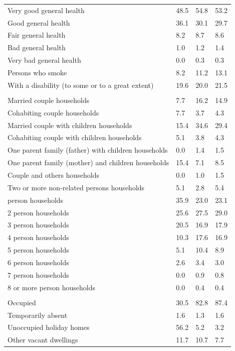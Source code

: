\documentclass{article}
\begin{document}
\begin{table}[h]
\begin{tabular}{KTTT}
    \hline
Very good general health & 48.5& 54.8& 53.2\\
Good general health & 36.1& 30.1& 29.7\\
Fair general health & 8.2& 8.7& 8.6\\
Bad general health & 1.0& 1.2& 1.4\\
Very bad general health & 0.0& 0.3& 0.3\\
    \hline
Persons who smoke &  8.2& 11.2& 13.1\\
    \hline
With a disability (to some or to a great extent) & 19.6& 20.0& 21.5\\
\hline
    \\ 
    \hline
Married couple households &  7.7& 16.2& 14.9\\
Cohabiting couple households & 7.7& 3.7& 4.3\\
Married couple with children households & 15.4& 34.6& 29.4\\
Cohabiting couple with children households & 5.1& 3.8& 4.3\\
One parent family (father) with  children households & 0.0& 1.4& 1.5\\
One parent family (mother) and children households & 15.4&  7.1&  8.5\\
Couple and others households  & 0.0& 1.0& 1.5\\
Two or more non-related persons households & 5.1& 2.8& 5.4\\
     person households & 35.9& 23.0& 23.1\\
2 person households & 25.6& 27.5& 29.0\\
3 person households & 20.5& 16.9& 17.9\\
4 person households & 10.3& 17.6& 16.9\\
5 person households &  5.1& 10.4&  8.9\\
6 person households & 2.6& 3.4& 3.0\\
7 person households & 0.0& 0.9& 0.8\\
8 or more person households & 0.0& 0.4& 0.4\\
\hline
    \\ 
    \hline
Occupied & 30.5& 82.8& 87.4\\
Temporarily absent & 1.6& 1.3& 1.6\\
Unoccupied holiday homes & 56.2&  5.2&  3.2\\
Other vacant dwellings & 11.7& 10.7&  7.7\\
\hline
\end{tabular}
\end{table}
\end{document}
